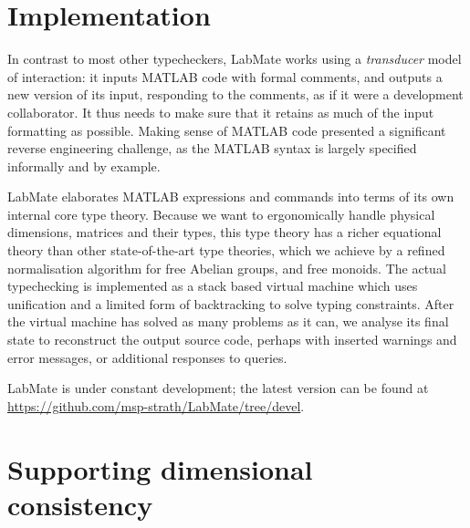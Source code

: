 \documentclass{IMEKO2024}
\newcommand{\remph}{\emph}
\begin{document}

\section{Implementation}

In contrast to most other typecheckers, LabMate works using a
\remph{transducer} model of interaction: it inputs MATLAB code with
formal comments, and outputs a new version of its input, responding to
the comments, as if it were a development collaborator.  It thus needs
to make sure that it retains as much of the input formatting as
possible.  Making sense of MATLAB code presented a significant reverse
engineering challenge, as the MATLAB syntax is largely specified
informally and by example.

LabMate elaborates MATLAB expressions and commands into terms of its own internal core type theory.
%
Because we want to ergonomically handle physical dimensions, matrices
and their types, this type theory has a richer equational theory than
other state-of-the-art type theories, which we achieve by a refined
normalisation algorithm for free Abelian groups, and free monoids.
%
The actual typechecking is implemented as a stack based virtual machine which uses unification and a limited form of backtracking to solve typing constraints.
%
After the virtual machine has solved as many problems as it can, we analyse its final state to reconstruct the output source code, perhaps with inserted warnings and error messages, or additional responses to queries.

LabMate is under constant development; the latest version can be found at \url{https://github.com/msp-strath/LabMate/tree/devel}.

\section{Supporting dimensional consistency}
\label{sec:example-revisited}

\end{document}

